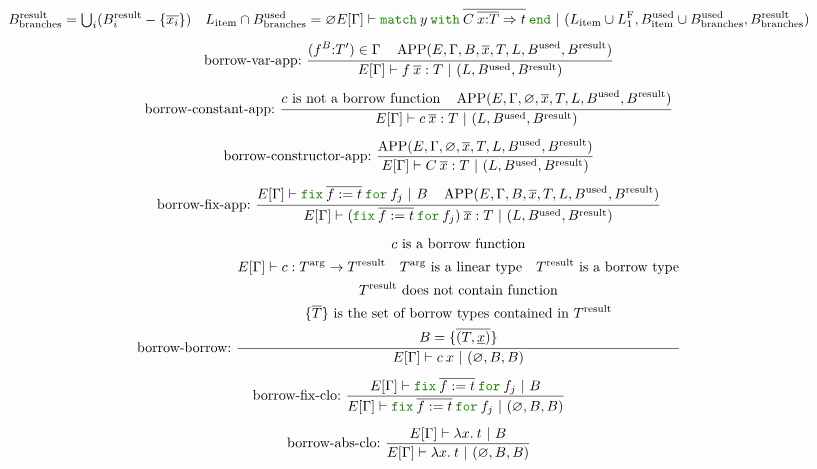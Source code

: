 \documentclass[a4paper,fleqn]{article}
\newcommand{\kwmatch}{\mbox{\color{mygreen}\ttfamily match}}
\newcommand{\kwwith}{\mbox{\color{mygreen}\ttfamily with}}
\newcommand{\kwend}{\mbox{\color{mygreen}\ttfamily end}}
\newcommand{\kwfix}{\mbox{\color{mygreen}\ttfamily fix}}
\newcommand{\kwfor}{\mbox{\color{mygreen}\ttfamily for}}
\newcommand{\lam}[2]{\lambda #1.\:#2}
\newcommand{\lassum}[2]{(#1\mathord{:}#2)}
\newcommand{\omatch}[2]{\kwmatch\:#1\:\kwwith\:{#2}\:\kwend}
\newcommand{\ofix}[2]{\kwfix\:{#1}\:\kwfor\:{#2}}
\newcommand{\tbigcup}{{\textstyle\bigcup}}
\newcommand{\breakrule}{\\[0.5em]}
\DeclareMathOperator{\APP}{APP}
\newcommand{\rep}[1]{\overline{#1}}
\begin{document}
\begin{gather*}
{\begin{gathered}
        B^\text{result}_\text{branches} = \tbigcup_i (B^\text{result}_i - \{\rep{x_i}\}) \quad
        L_\text{item} \cap B^\text{used}_\text{branches} = \varnothing \\
      \end{gathered}
    }{
      E[\Gamma] \vdash \omatch{y}{\rep{C\: \rep{x{:}T} \Rightarrow t}} ~|~ (L_\text{item} \cup L^\text{F}_1, B^\text{used}_\text{item} \cup B^\text{used}_\text{branches}, B^\text{result}_\text{branches})
    } \breakrule
  \text{borrow-var-app:}~
    \dfrac{
      \begin{gathered}
        \lassum{f^{B}}{T'} \in \Gamma \quad
        \APP(E, \Gamma, B, \rep{x}, T, L, B^\text{used}, B^\text{result})
      \end{gathered}
    }{
      E[\Gamma] \vdash f\:\rep{x} : T ~|~ (L, B^\text{used}, B^\text{result})
    } \breakrule
  \text{borrow-constant-app:}~
    \dfrac{
      \begin{gathered}
        \text{$c$ is not a borrow function} \quad
        \APP(E, \Gamma, \varnothing, \rep{x}, T, L, B^\text{used}, B^\text{result})
      \end{gathered}
    }{
      E[\Gamma] \vdash c\:\rep{x} : T ~|~ (L, B^\text{used}, B^\text{result})
    } \breakrule
  \text{borrow-constructor-app:}~
    \dfrac{
      \APP(E, \Gamma, \varnothing, \rep{x}, T, L, B^\text{used}, B^\text{result})
    }{
      E[\Gamma] \vdash C\: \rep{x} : T ~|~ (L, B^\text{used}, B^\text{result})
    } \breakrule
  \text{borrow-fix-app:}~
    \dfrac{
      \begin{gathered}
        E[\Gamma] \vdash \ofix{\rep{f:=t}}{f_j} ~|~ B \quad
        \APP(E, \Gamma, B, \rep{x}, T, L, B^\text{used}, B^\text{result})
      \end{gathered}
    }{
      E[\Gamma] \vdash (\ofix{\rep{f:=t}}{f_j})\:\rep{x} : T ~|~ (L, B^\text{used}, B^\text{result})
    } \breakrule
  \text{borrow-borrow:}~
    \dfrac{
      \begin{gathered}
        \text{$c$ is a borrow function} \\
        E[\Gamma] \vdash c : T^\text{arg} \rightarrow T^\text{result} \quad
        \text{$T^\text{arg}$ is a linear type} \quad
        \text{$T^\text{result}$ is a borrow type} \\
        \text{$T^\text{result}$ does not contain function} \\
        \text{$\{\rep{T}\}$ is the set of borrow types contained in $T^\text{result}$} \\
        B = \{\rep{(T,\underline{x})}\}
      \end{gathered}
    }{
      E[\Gamma] \vdash c\:x ~|~ (\varnothing, B, B)
    } \breakrule
  \text{borrow-fix-clo:}~
    \dfrac{
      E[\Gamma] \vdash \ofix{\rep{f:=t}}{f_j} ~|~ B
    }{
      E[\Gamma] \vdash \ofix{\rep{f:=t}}{f_j} ~|~ (\varnothing, B, B)
    } \breakrule
  \text{borrow-abs-clo:}~
    \dfrac{
      E[\Gamma] \vdash \lam{x}{t} ~|~ B
    }{
      E[\Gamma] \vdash \lam{x}{t} ~|~ (\varnothing, B, B)
    }
\end{gather*}
\end{document}
